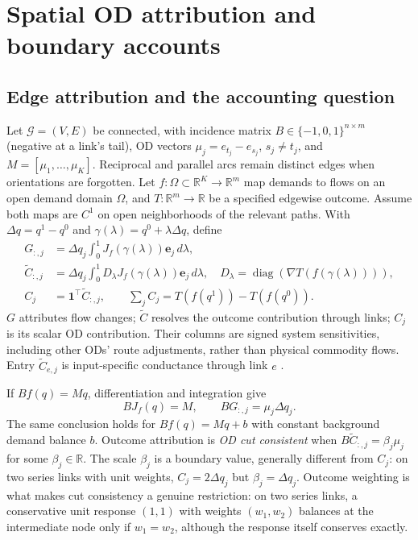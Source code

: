 \documentclass[a4paper,fleqn]{cas-sc}
\newcommand{\R}{\mathbb{R}}
\begin{document}
\section{Spatial OD attribution and boundary accounts}\label{sec:objects}
\subsection{Edge attribution and the accounting question}
Let $\mathcal G=(V,E)$ be connected, with incidence matrix
$B\in\{-1,0,1\}^{n\times m}$ (negative at a link's tail), OD vectors
$\mu_j=e_{t_j}-e_{s_j}$, $s_j\ne t_j$, and $M=[\mu_1,\ldots,\mu_K]$.
Reciprocal and parallel arcs remain distinct edges when orientations are
forgotten. Let $f:\Omega\subset\R^K\to\R^m$ map demands to flows on an
open demand domain $\Omega$, and
$T:\R^m\to\R$ be a specified edgewise outcome. Assume both maps are $C^1$
on open neighborhoods of the relevant paths. With $\Delta q=q^1-q^0$ and
$\gamma(\lambda)=q^0+\lambda\Delta q$, define
\begin{align}
G_{:,j}&=\Delta q_j\int_0^1 J_f(\gamma(\lambda))\mathbf e_j\,d\lambda,
\label{eq:Gdef}\\
\widetilde C_{:,j}&=\Delta q_j\int_0^1 D_\lambda J_f(\gamma(\lambda))\mathbf e_j\,d\lambda,
\quad D_\lambda=\operatorname{diag}(\nabla T(f(\gamma(\lambda)))),
\label{eq:Cdef}\\
C_j&=\mathbf1^\top\widetilde C_{:,j},\qquad
\sum_j C_j=T(f(q^1))-T(f(q^0)).\label{eq:Cscalar}
\end{align}
$G$ attributes flow changes; $\widetilde C$ resolves the outcome contribution
through links; $C_j$ is its scalar OD contribution. Their columns are signed
system sensitivities, including other ODs' route adjustments, rather than
physical commodity flows. Entry $\widetilde C_{e,j}$ is input-specific
conductance through link $e$ \citep{dhamdhere2019important}.\label{sec:whyC}

If $Bf(q)=Mq$, differentiation and integration give
\begin{equation}
BJ_f(q)=M,\qquad BG_{:,j}=\mu_j\Delta q_j.\label{eq:anchorchain}
\end{equation}
The same conclusion holds for $Bf(q)=Mq+b$ with constant background demand
balance $b$. Outcome attribution is \emph{OD cut consistent} when
$B\widetilde C_{:,j}=\beta_j\mu_j$ for some $\beta_j\in\R$.
The scale $\beta_j$ is a boundary value, generally different from $C_j$:
on two series links with unit weights, $C_j=2\Delta q_j$ but
$\beta_j=\Delta q_j$. Outcome weighting is what makes cut consistency a
genuine restriction: on two series links, a conservative unit response
$(1,1)$ with weights $(w_1,w_2)$ balances at the intermediate node only
if $w_1=w_2$, although the response itself conserves exactly.
\end{document}
